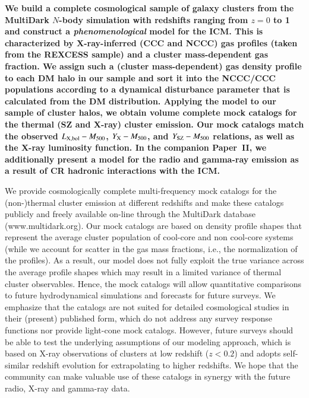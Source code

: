 \documentclass[useAMS,usenatbib]{mn2e}
\begin{document}
{\bf We build a complete cosmological sample of galaxy clusters from the
  MultiDark $N$-body simulation with redshifts ranging from $z = 0$ to 1 and
  construct a \emph{phenomenological} model for the ICM. This is characterized
  by X-ray-inferred (CCC and NCCC) gas profiles (taken from the REXCESS sample)
  and a cluster mass-dependent gas fraction. We assign such a (cluster
  mass-dependent) gas density profile to each DM halo in our sample and sort it
  into the NCCC/CCC populations according to a dynamical disturbance parameter
  that is calculated from the DM distribution. Applying the model to our sample
  of cluster halos, we obtain volume complete mock catalogs for the
  thermal (SZ and X-ray) cluster emission. Our mock catalogs match the observed
  $L_{{\mathrm{X, bol}}}-M_{500}$, $Y_{{\mathrm{X}}}-M_{500}$, and $Y_{{\mathrm{SZ}}}-M_{500}$
  relations, as well as the X-ray luminosity function.  In the companion
  Paper~II, we additionally present a model for the radio and gamma-ray emission
  as a result of CR hadronic interactions with the ICM. 

  We provide cosmologically complete multi-frequency mock catalogs for the
  (non-)thermal cluster emission at different redshifts and make these catalogs
  publicly and freely available on-line through the MultiDark database
  (www.multidark.org). Our mock catalogs are based on density profile shapes
  that represent the average cluster population of cool-core and non cool-core
  systems (while we account for scatter in the gas mass fractions, i.e., the
  normalization of the profiles). As a result, our model does not fully exploit
  the true variance across the average profile shapes which may result in a
  limited variance of thermal cluster observables.  Hence, the mock catalogs
  will allow quantitative comparisons to future hydrodynamical simulations and
  forecasts for future surveys.  We emphasize that the catalogs are not suited
  for detailed cosmological studies in their (present) published form, which do
  not address any survey response functions nor provide light-cone mock
  catalogs. However, future surveys should be able to test the underlying
  assumptions of our modeling approach, which is based on X-ray observations of
  clusters at low redshift ($z<0.2$) and adopts self-similar redshift evolution
  for extrapolating to higher redshifts. We hope that the community can make
  valuable use of these catalogs in synergy with the future radio, X-ray and
  gamma-ray data.}



\end{document}
